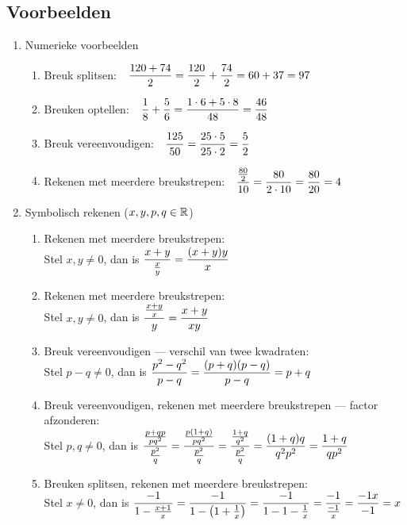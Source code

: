 \documentclass[numbers,wordchoicegiven]{ximera}
\begin{document}
\subsection{Voorbeelden}
\begin{enumerate}
	\item Numerieke voorbeelden
	\begin{enumerate}
		\item Breuk splitsen:\ \ $\displaystyle{\frac{120+74}{2}=\frac{120}{2}+\frac{74}{2}=60+37=97}$
		\item Breuken optellen:\ \ $\displaystyle{\frac{1}{8}+\frac{5}{6}=\frac{1 \cdot 6+5 \cdot 8}{48}=\frac{46}{48}}$
		\item Breuk vereenvoudigen:\ \ $\displaystyle{\frac{125}{50}=\frac{25 \cdot 5}{25 \cdot 2}=\frac{5}{2}}$
		\item Rekenen met meerdere breukstrepen:\ \ $\displaystyle{\frac{\frac{80}{2}}{10}=\frac{80}{2\cdot10}=\frac{80}{20}=4}$
	\end{enumerate}
	
	\item Symbolisch rekenen ($x,y,p,q\in\mathbb{R}$)
	\begin{enumerate}
		\item Rekenen met meerdere breukstrepen:\\
		Stel $x,y \neq 0$, dan is $\displaystyle{\frac{x+y}{\frac{x}{y}}=\frac{(x+y)y}{x}}$
		\item Rekenen met meerdere breukstrepen:\\
		Stel $x,y \neq 0$, dan is $\ds{\frac{\frac{x+y}{x}}{\ y\ }=\frac{x+y}{xy}}$
		\item Breuk vereenvoudigen --- verschil van twee kwadraten:\\
		Stel $p-q \neq 0$, dan is $\displaystyle{\frac{p^{2}-q^{2}}{p-q}=\frac{(p+q)(p-q)}{p-q}=p+q}$
		\item Breuk vereenvoudigen, rekenen met meerdere breukstrepen --- factor afzonderen:\\
		Stel $p,q \neq 0$, dan is $\displaystyle{\frac{\frac{p+qp}{pq^{2}}}{\frac{p^{2}}{q}}=\frac{\frac{p(1+q)}{pq^{2}}}{\frac{p^{2}}{q}}=
			\frac{\frac{1+q}{q^{2}}}{\frac{p^{2}}{q}}=\frac{(1+q)q}{q^{2}p^2}=\frac{1+q}{qp^{2}}}$
		\item Breuken splitsen, rekenen met meerdere breukstrepen:\\
		Stel $x \neq 0$, dan is $\displaystyle{\frac{-1}{1-\frac{x+1}{x}}=\frac{-1}{1-\left(1+\frac{1}{x}\right)}=\frac{-1}{1-1-\frac{1}{x}}=\frac{-1}{\frac{-1}{x}}=\frac{-1x}{-1}=x}$
	\end{enumerate}
\end{enumerate}
\end{document}
